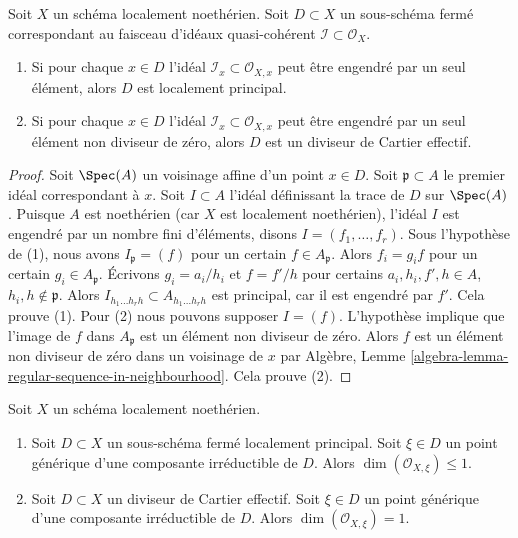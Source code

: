 \begin{lemma}
\label{lemma-effective-Cartier-in-points}
Soit  $X$  un schéma localement noethérien. Soit  $D \subset X$  un
sous-schéma fermé correspondant au faisceau d'idéaux quasi-cohérent  $\mathcal{I} \subset \mathcal{O}_X$.
\begin{enumerate}
\item Si pour chaque  $x \in D$  l'idéal  $\mathcal{I}_x \subset \mathcal{O}_{X, x}$  peut être engendré par un seul
élément, alors  $D$  est localement principal.
\item Si pour chaque  $x \in D$  l'idéal  $\mathcal{I}_x \subset \mathcal{O}_{X, x}$  peut être engendré par un seul
élément non diviseur de zéro, alors  $D$  est un diviseur de Cartier
effectif.
\end{enumerate}
\end{lemma}

\begin{proof}
Soit  $\Spec(A)$  un voisinage affine d'un point  $x \in D$. Soit  $\mathfrak p \subset A$ 
le premier idéal correspondant à  $x$. Soit  $I \subset A$  l'idéal
définissant la trace de  $D$  sur  $\Spec(A)$. Puisque  $A$  est
noethérien (car  $X$  est localement noethérien), l'idéal  $I$  est
engendré par un nombre fini d'éléments, disons  $I = (f_1, \ldots, f_r)$. Sous l'hypothèse de
(1), nous avons  $I_\mathfrak p = (f)$  pour un certain  $f \in A_\mathfrak p$. Alors  $f_i = g_i f$  pour
un certain  $g_i \in A_\mathfrak p$. Écrivons  $g_i = a_i/h_i$  et  $f = f'/h$  pour certains
 $a_i, h_i, f', h \in A$,  $h_i, h \not \in \mathfrak p$. Alors  $I_{h_1 \ldots h_r h} \subset A_{h_1 \ldots h_r h}$  est principal, car il est engendré
par  $f'$. Cela prouve (1). Pour (2) nous pouvons supposer  $I = (f)$.
L'hypothèse implique que l'image de  $f$  dans  $A_\mathfrak p$  est un élément
non diviseur de zéro. Alors  $f$  est un élément non diviseur de zéro dans
un voisinage de  $x$  par Algèbre, Lemme  \ref{algebra-lemma-regular-sequence-in-neighbourhood}. Cela prouve (2).
\end{proof}

\begin{lemma}
\label{lemma-effective-Cartier-codimension-1}
Soit  $X$  un schéma localement noethérien.
\begin{enumerate}
\item Soit  $D \subset X$  un sous-schéma fermé localement principal. Soit  $\xi \in D$  un
point générique d'une composante irréductible de  $D$. Alors  $\dim(\mathcal{O}_{X, \xi}) \leq 1$.
\item Soit  $D \subset X$  un diviseur de Cartier effectif. Soit  $\xi \in D$  un point
générique d'une composante irréductible de  $D$. Alors  $\dim(\mathcal{O}_{X, \xi}) = 1$.
\end{enumerate}
\end{lemma}

